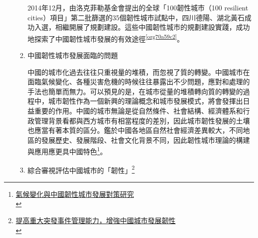 \documentclass[a4paper,12pt]{article}
\begin{document}
\begin{enumerate}
\begin{enumerate}
2014年12月，由洛克菲勒基金會提出的全球「100韌性城市（100 resilient cities）項目」第二批篩選的35個韌性城市試點中，四川德陽、湖北黃石成功入選，相繼開展了規劃建設。這些中國韌性城市的規劃建設實踐，成功地探索了中國韌性城市發展的有效途徑\textsuperscript{\ref{org70a59c2}}。\\

\item 中國韌性城市發展面臨的問題
\label{sec:org5eb9fcb}

中國的城市化過去往往只重視量的堆積，而忽視了質的轉變。中國城市在面臨氣候變化、各種災害危機的時候往往暴露出不少問題，應對和處理的手法也簡單而無力。可以預見的是，在城市從量的堆積轉向質的轉變的過程中，城市韌性作為一個新興的理論概念和城市發展模式，將會發揮出日益重要的作用。中國的城市無論是從自然條件、社會結構、經濟體系和行政管理背景看都與西方城市有相當程度的差別，因此城市韌性發展的土壤也應當有著本質的區分。鑑於中國各地區自然社會經濟差異較大，不同地區的發展歷史、發展階段、社會文化背景不同，因此韌性城市理論的構建與應用應更具中國特色\footnote{\href{https://www.sanmin.com.tw/Product/Index/006005940}{氣候變化與中國韌性城市發展對策研究}\\}。\\

\item 綜合審視評估中國城市的「韌性」\footnote{\href{https://www.google.com/url?sa=t\&rct=j\&q=\&esrc=s\&source=web\&cd=\&cad=rja\&uact=8\&ved=2ahUKEwin1OfxgcTvAhVmHKYKHZ3HBdgQFjAAegQIBRAD\&url=https\%3A\%2F\%2Fwww.pwccn.com\%2Fzh\%2Fconsulting\%2Fpublications\%2Fresilient-city.pdf\&usg=AOvVaw3Hqz75zjZH72R-USxTaGjH}{提高重大突發事件管理能力，增強中國城市發展韌性}\\}
\label{sec:orgd7e6aaa}


\end{enumerate}
\end{enumerate}
\end{document}
